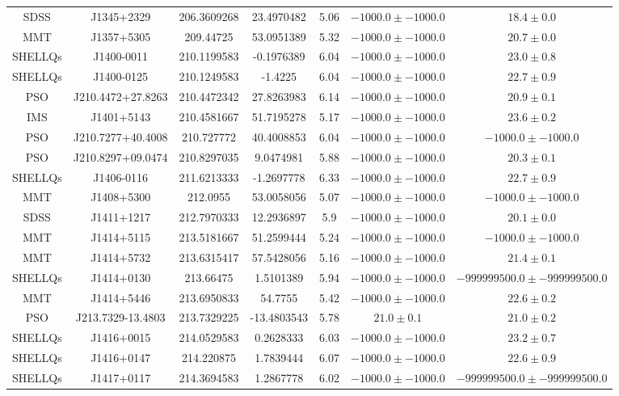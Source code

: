 \begin{table}
\begin{tabular}{ccccccc}
SDSS & J1345+2329 & 206.3609268 & 23.4970482 & 5.06 & $-1000.0\pm-1000.0$ & $  18.4\pm  0.0$ \\
MMT & J1357+5305 & 209.44725 & 53.0951389 & 5.32 & $-1000.0\pm-1000.0$ & $  20.7\pm  0.0$ \\
SHELLQs & J1400-0011 & 210.1199583 & -0.1976389 & 6.04 & $-1000.0\pm-1000.0$ & $  23.0\pm  0.8$ \\
SHELLQs & J1400-0125 & 210.1249583 & -1.4225 & 6.04 & $-1000.0\pm-1000.0$ & $  22.7\pm  0.9$ \\
PSO & J210.4472+27.8263 & 210.4472342 & 27.8263983 & 6.14 & $-1000.0\pm-1000.0$ & $  20.9\pm  0.1$ \\
IMS & J1401+5143 & 210.4581667 & 51.7195278 & 5.17 & $-1000.0\pm-1000.0$ & $  23.6\pm  0.2$ \\
PSO & J210.7277+40.4008 & 210.727772 & 40.4008853 & 6.04 & $-1000.0\pm-1000.0$ & $-1000.0\pm-1000.0$ \\
PSO & J210.8297+09.0474 & 210.8297035 & 9.0474981 & 5.88 & $-1000.0\pm-1000.0$ & $  20.3\pm  0.1$ \\
SHELLQs & J1406-0116 & 211.6213333 & -1.2697778 & 6.33 & $-1000.0\pm-1000.0$ & $  22.7\pm  0.9$ \\
MMT & J1408+5300 & 212.0955 & 53.0058056 & 5.07 & $-1000.0\pm-1000.0$ & $-1000.0\pm-1000.0$ \\
SDSS & J1411+1217 & 212.7970333 & 12.2936897 & 5.9 & $-1000.0\pm-1000.0$ & $  20.1\pm  0.0$ \\
MMT & J1414+5115 & 213.5181667 & 51.2599444 & 5.24 & $-1000.0\pm-1000.0$ & $-1000.0\pm-1000.0$ \\
MMT & J1414+5732 & 213.6315417 & 57.5428056 & 5.16 & $-1000.0\pm-1000.0$ & $  21.4\pm  0.1$ \\
SHELLQs & J1414+0130 & 213.66475 & 1.5101389 & 5.94 & $-1000.0\pm-1000.0$ & $-999999500.0\pm-999999500.0$ \\
MMT & J1414+5446 & 213.6950833 & 54.7755 & 5.42 & $-1000.0\pm-1000.0$ & $  22.6\pm  0.2$ \\
PSO & J213.7329-13.4803 & 213.7329225 & -13.4803543 & 5.78 & $  21.0\pm  0.1$ & $  21.0\pm  0.2$ \\
SHELLQs & J1416+0015 & 214.0529583 & 0.2628333 & 6.03 & $-1000.0\pm-1000.0$ & $  23.2\pm  0.7$ \\
SHELLQs & J1416+0147 & 214.220875 & 1.7839444 & 6.07 & $-1000.0\pm-1000.0$ & $  22.6\pm  0.9$ \\
SHELLQs & J1417+0117 & 214.3694583 & 1.2867778 & 6.02 & $-1000.0\pm-1000.0$ & $-999999500.0\pm-999999500.0$ \\

\end{tabular}
\end{table}
